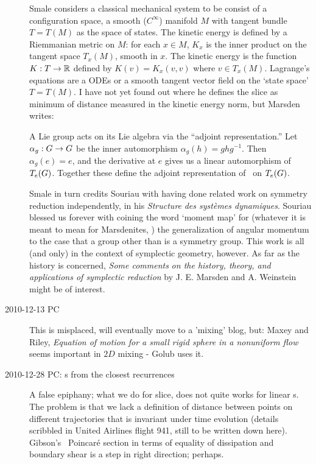 \begin{description}
Smale considers a classical mechanical system to be consist of a
configuration space, a smooth ($C^\infty$) manifold $M$ with tangent
bundle $T=T(M)$ as the space of states. The kinetic energy is defined by
a Riemmanian metric on $M$: for each $x\in M$, $K_x$ is the inner product
on the tangent space $T_x(M)$, smooth in $x$. The kinetic energy is the
function $K : T \to \mathbb{R}$ defined by $K(v) = K_x(v,v)$ where $v \in
T_x(M)$. Lagrange's equations are a ODEs or a smooth tangent vector field
on the `state space' $T=T(M)$. I have not yet found out where he defines the slice
as minimum of distance measured in the kinetic energy norm, but
Marsden writes:


													\toCB
A Lie group acts on its Lie algebra via the ``adjoint representation.''
Let $\alpha_g : G \to G$ be the inner automorphism $\alpha_g(h)
= gh g^{-1}$. Then $\alpha_g(e) = e$, and the derivative at $e$ gives us
a linear automorphism of $T_e(G)$. Together these define the adjoint
representation of \Group\ on $T_e(G)$.


Smale in turn credits Souriau with having done related
work on symmetry reduction independently, in his
{\emph{Structure}} \emph{des syst\`emes dynamiques}. Souriau blessed us forever with
coining the word `moment map' for (whatever it is meant to mean for Marsdenites,
\ie)
the generalization of angular momentum to the case that a group other than
{} is a symmetry group.
This work is all (and only) in the
context of symplectic geometry, however. As far as the history is concerned,
{\emph{Some comments}} \emph{on the history, theory, and applications of
symplectic reduction} by J. E. Marsden and A. Weinstein
might be of interest.

\item[2010-12-13 PC]
This is misplaced, will eventually move to a 'mixing' blog, but:
Maxey and Riley,
{\em Equation of motion for a small rigid sphere in a nonuniform flow}
seems important in $2D$ mixing - Golub uses it.

\item[2010-12-28 PC:
{\PoincSec}s from the closest recurrences]
A false epiphany; what we do for slice, does not quite works for linear
{\PoincSec}s. The problem is that we lack a definition of distance
between points on different trajectories that is invariant under time
evolution (details scribbled in United Airlines flight 941, still to be
written down here). Gibson's \pCf\ Poincar\'e section in terms of
equality of dissipation and boundary shear is a step in right direction;
perhaps.



\end{description}
